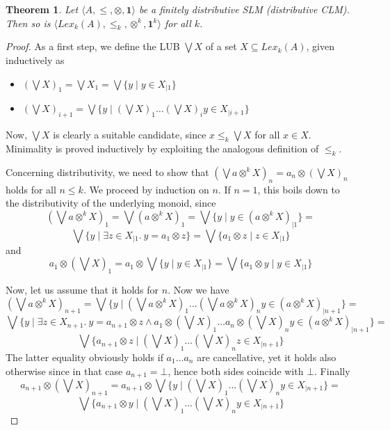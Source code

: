 \documentclass[a4paper]{elsarticle}
\newtheorem{theorem}{Theorem}
\newcommand{\monop}{\otimes}
\newcommand{\1}{\mathbf{1}}
\begin{document}
\begin{theorem}\label{theo:lexiSLM}
	Let $\langle A, \leq, \monop, \1 \rangle$ be a finitely distributive SLM (distributive CLM).
	Then so is $\langle Lex_k(A), \leq_k, \monop^k, \1^k \rangle$ for all $k$.
\end{theorem}
\begin{proof}
	As a first step, we define the LUB $\bigvee X$ of a set $X \subseteq Lex_k(A)$,
	given inductively as
	\begin{itemize}
		\item $(\bigvee X)_1 = \bigvee X_1 = \bigvee \{ y \mid y \in X_{\mid 1}\}$
		\item $(\bigvee X)_{i+1} = \bigvee \{ y \mid (\bigvee X)_1 \ldots (\bigvee X)_i y \in X_{\mid i+1}\}$
	\end{itemize}
	
	Now, $\bigvee X$ is clearly a suitable candidate, since $x \leq_k \bigvee X$ for all 
	$x \in X$. Minimality is proved inductively by exploiting the analogous 
	definition of $\leq_k$.
	
	Concerning distributivity, we need to show that
	$(\bigvee a \otimes^k X)_n = a_n \otimes (\bigvee X)_n$ holds for all $n \leq k$.
	We proceed by induction on $n$. If $n = 1$, this boils down to the distributivity of 
	the underlying monoid, since
	$$(\bigvee a \otimes^k X)_1 = \bigvee (a \otimes^k X)_1 = \bigvee \{ y \mid y \in (a \otimes^k X)_{\mid 1}\} =$$
	$$\bigvee \{ y \mid \exists z \in X_{\mid 1}.\ y = a_1 \otimes z\} = \bigvee \{ a_1 \otimes z \mid z \in X_{\mid 1}\}$$
	and 
	$$ a_1 \otimes (\bigvee X)_1 = a_1 \otimes \bigvee \{ y \mid y \in X_{\mid 1}\}  = \bigvee \{ a_1 \otimes y \mid y \in X_{\mid 1}\}$$
	
	Now, let us assume that it holds for $n$. Now we have 
	$$(\bigvee a \otimes^k X)_{n+1} = \bigvee \{ y \mid (\bigvee a \otimes^k X)_1 \ldots (\bigvee a \otimes^k X)_n y \in (a \otimes^k X)_{\mid n+1}\} =$$
	$$ \bigvee \{ y \mid \exists z \in X_{n+1}.\ y = a_{n+1} \otimes z \wedge a_1 \otimes (\bigvee X)_1 \ldots a_n \otimes (\bigvee X)_n y \in (a \otimes^k X)_{\mid n+1}\} =$$
	$$ \bigvee \{ a_{n+1} \otimes z \mid (\bigvee X)_1 \ldots (\bigvee X)_n z \in X_{\mid n+1}\}$$
	The latter equality obviously holds if $a_1 \ldots a_n$ are cancellative, yet it holds also otherwise since in that case 
	$a_{n+1} = \bot$, hence both sides coincide with $\bot$. Finally
	$$a_{n+1} \otimes (\bigvee X)_{n+1} = a_{n+1} \otimes \bigvee \{ y \mid (\bigvee X)_1 \ldots (\bigvee X)_n y \in X_{\mid n+1}\}  =$$
	$$ \bigvee \{ a_{n+1} \otimes y \mid (\bigvee X)_1 \ldots (\bigvee X)_n y \in X_{\mid n+1}\}$$
\end{proof}
\end{document}
